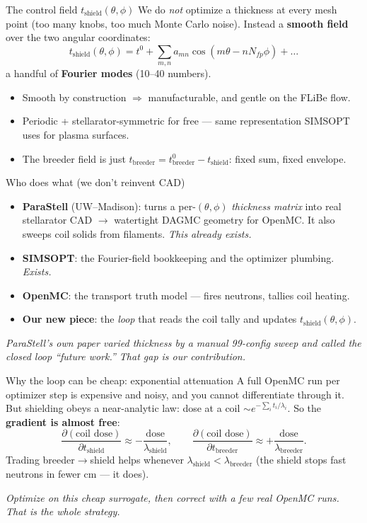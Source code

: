 \documentclass[11pt,aspectratio=169]{beamer}
\newcommand{\key}[1]{\textcolor{key}{\textbf{#1}}}
\newcommand{\qq}[1]{\begin{center}\emph{#1}\end{center}}
\begin{document}
\begin{frame}{The control field \(t_{\text{shield}}(\theta,\phi)\)}
We do \emph{not} optimize a thickness at every mesh point (too many knobs, too much Monte
Carlo noise). Instead a \key{smooth field} over the two angular coordinates:
\[
t_{\text{shield}}(\theta,\phi) = t^0 + \sum_{m,n} a_{mn}\cos(m\theta - nN_{fp}\phi) + \dots
\]
a handful of \key{Fourier modes} (10--40 numbers).
\begin{itemize}\footnotesize
\item Smooth by construction $\Rightarrow$ manufacturable, and gentle on the FLiBe flow.
\item Periodic + stellarator-symmetric for free --- same representation SIMSOPT uses for
      plasma surfaces.
\item The breeder field is just \(t_{\text{breeder}} = t^0_{\text{breeder}} -
      t_{\text{shield}}\): fixed sum, fixed envelope.
\end{itemize}
\end{frame}

\begin{frame}{Who does what (we don't reinvent CAD)}
\begin{itemize}
\item \key{ParaStell} (UW--Madison): turns a per-\((\theta,\phi)\) \emph{thickness matrix}
      into real stellarator CAD $\to$ watertight DAGMC geometry for OpenMC. It also sweeps
      coil solids from filaments. \emph{This already exists.}
\item \key{SIMSOPT}: the Fourier-field bookkeeping and the optimizer plumbing. \emph{Exists.}
\item \key{OpenMC}: the transport truth model --- fires neutrons, tallies coil heating.
\item \key{Our new piece}: the \emph{loop} that reads the coil tally and updates
      \(t_{\text{shield}}(\theta,\phi)\).
\end{itemize}
\qq{ParaStell's own paper varied thickness by a \emph{manual} 99-config sweep and called the
closed loop ``future work.'' That gap is our contribution.}
\end{frame}

\begin{frame}{Why the loop can be cheap: exponential attenuation}
A full OpenMC run per optimizer step is expensive and noisy, and you cannot differentiate
through it. But shielding obeys a near-analytic law: dose at a coil \(\sim
e^{-\sum_i t_i/\lambda_i}\). So the \key{gradient is almost free}:
\[
\frac{\partial(\text{coil dose})}{\partial t_{\text{shield}}}\approx -\frac{\text{dose}}{\lambda_{\text{shield}}},
\qquad
\frac{\partial(\text{coil dose})}{\partial t_{\text{breeder}}}\approx +\frac{\text{dose}}{\lambda_{\text{breeder}}}.
\]
Trading breeder\(\to\)shield helps whenever \(\lambda_{\text{shield}}<\lambda_{\text{breeder}}\)
(the shield stops fast neutrons in fewer cm --- it does).
\qq{Optimize on this cheap surrogate, then \emph{correct} with a few real OpenMC runs. That
is the whole strategy.}
\end{frame}
\end{document}

